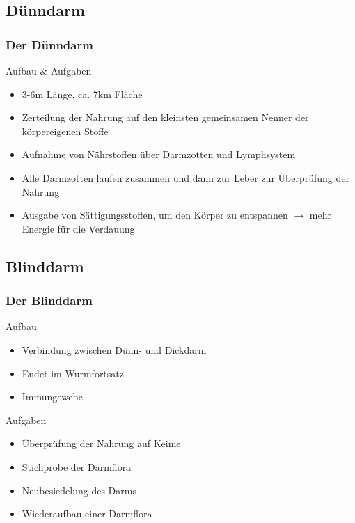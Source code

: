 \documentclass[xcolor=dvipsnames]{beamer}
\begin{document}
    \subsection{Dünndarm}
    \begin{frame}
        \frametitle{Der Dünndarm}

        \begin{block}{Aufbau \& Aufgaben}
            \begin{itemize}
                \setlength\itemsep{1em}
                \item 3-6m Länge, ca. 7km Fläche
                \item Zerteilung der Nahrung auf den kleinsten gemeinsamen Nenner der körpereigenen Stoffe
                \item Aufnahme von Nährstoffen über Darmzotten und Lymphsystem
                \item Alle Darmzotten laufen zusammen und dann zur Leber zur Überprüfung der Nahrung
                \item Ausgabe von Sättigungsstoffen, um den Körper zu entspannen $\rightarrow$ mehr Energie für die Verdauung
            \end{itemize}
        \end{block}
    \end{frame}

    \subsection{Blinddarm}
    \begin{frame}[allowframebreaks]
        \frametitle{Der Blinddarm}

        \begin{block}{Aufbau}
            \begin{itemize}
                \setlength\itemsep{1em}
                \item Verbindung zwischen Dünn- und Dickdarm
                \item Endet im Wurmfortsatz
                \item Immungewebe
            \end{itemize}
        \end{block}

        \framebreak

        \begin{block}{Aufgaben}
            \begin{itemize}
                \setlength\itemsep{1em}
                \item Überprüfung der Nahrung auf Keime
                \item Stichprobe der Darmflora
                \item Neubesiedelung des Darms
                \item Wiederaufbau einer Darmflora
            \end{itemize}
        \end{block}
    \end{frame}
\end{document}

